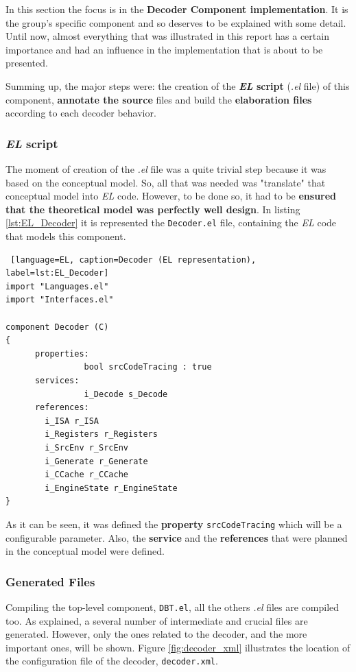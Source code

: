 
In this section the focus is in the \textbf{Decoder Component implementation}. It is the group's specific component and so deserves to be explained with some detail. Until now, almost everything that was illustrated in this report has a certain importance and had an influence in the implementation that is about to be presented.

Summing up, the major steps were: the creation of the \textbf{\textit{EL} script} (\textit{.el} file) of this component,\textbf{ annotate the source} files and build the \textbf{elaboration files} according to each decoder behavior. 

\subsubsection{\textit{EL} script}

The moment of creation of the \textit{.el} file was a quite trivial step because it was based on the conceptual model. So, all that was needed was "translate" that conceptual model into \textit{EL} code. However, to be done so, it had to be \textbf{ensured that the theoretical model was perfectly well design}. In listing \ref{lst:EL_Decoder} it is represented the \texttt{Decoder.el} file, containing the \textit{EL} code that models this component.

\begin{lstlisting} [language=EL, caption=Decoder (EL representation), label=lst:EL_Decoder]
import "Languages.el"
import "Interfaces.el"

component Decoder (C)
{
      properties:
      			bool srcCodeTracing : true
      services:
      			i_Decode s_Decode
      references:
        i_ISA r_ISA
        i_Registers r_Registers
        i_SrcEnv r_SrcEnv
        i_Generate r_Generate
        i_CCache r_CCache
        i_EngineState r_EngineState
}
\end{lstlisting}

As it can be seen, it was defined the \textbf{property} \texttt{srcCodeTracing} which will be a configurable parameter. Also, the \textbf{service} and the \textbf{references} that were planned in the conceptual model were defined.


\subsubsection{Generated Files}

Compiling the top-level component, \texttt{DBT.el}, all the others \textit{.el} files are compiled too. As explained, a several number of intermediate and crucial files are generated. However, only the ones related to the decoder, and the more important ones, will be shown. Figure \ref{fig:decoder_xml} illustrates the location of the configuration file of the decoder, \texttt{decoder.xml}.

